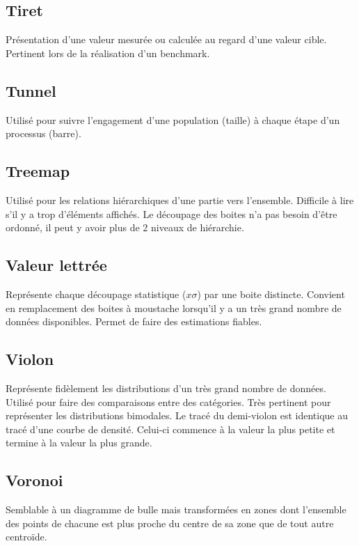 \documentclass[a4paper,12pt]{article}
\begin{document}
\begin{multicols}{2}
\subsection*{Tiret}
\label{sec:orgfe503c1}
Présentation d'une valeur mesurée ou calculée au regard d'une valeur cible. \autocite{alansmithLexiqueVisuel} Pertinent lors de la réalisation d'un benchmark. \autocite{mikeyiHowChooseRight2020}
\subsection*{Tunnel}
\label{sec:orgf29cc80}
Utilisé pour suivre l'engagement d'une population (taille) à chaque étape d'un processus (barre). \autocite{mikeyiHowChooseRight2020}
\subsection*{Treemap}
\label{sec:org923211d}
Utilisé pour les relations hiérarchiques d'une partie vers l'ensemble. Difficile à lire s'il y a trop d'éléments affichés. \autocite{alansmithLexiqueVisuel}
Le découpage des boites n'a pas besoin d'être ordonné, il peut y avoir plus de 2 niveaux de hiérarchie. \autocite{mikeyiHowChooseRight2020}
\subsection*{Valeur lettrée}
\label{sec:org1b632bc}
Représente chaque découpage statistique (\(x\sigma\)) par une boite distincte. Convient en remplacement des boites à moustache lorsqu'il y a un très grand nombre de données disponibles. Permet de faire des estimations fiables. \autocite{hofmannLettervaluePlotsBoxplots2017,mikeyiHowChooseRight2020}
\subsection*{Violon}
\label{sec:org0982706}
Représente fidèlement les distributions d'un très grand nombre de données. \autocite{alansmithLexiqueVisuel} Utilisé pour faire des comparaisons entre des catégories. \autocite{mikeyiHowChooseRight2020}  Très pertinent pour représenter les distributions bimodales. \autocite{wilkeVisualizingManyDistributions2019} Le tracé du demi-violon est identique au tracé d'une courbe de densité. Celui-ci commence à la valeur la plus petite et termine à la valeur la plus grande.
\subsection*{Voronoi}
\label{sec:org79fbab1}
Semblable à un diagramme de bulle mais transformées en zones dont l'ensemble des points de chacune est plus proche du centre de sa zone que de tout autre centroïde. \autocite{alansmithLexiqueVisuel}

\end{multicols}
\end{document}

